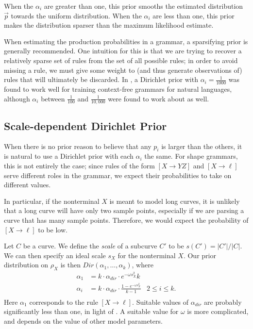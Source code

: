 When the $\alpha_i$ are greater than one, this prior smooths the
estimated distribution $\vec{p}$ towards the uniform
distribution. When the $\alpha_i$ are less than one, this prior makes
the distribution sparser than the maximum likelihood estimate. 

When estimating the production probabilities in a grammar, a
sparsifying prior is generally recommended. One intuition for this is
that we are trying to recover a relatively sparse set of rules from
the set of all possible rules; in order to avoid missing a rule, we
must give some weight to (and thus generate observations of) rules
that will ultimately be discarded. In \cite{johnson-naacl}, a
Dirichlet prior with $\alpha_i = \frac{1}{1000}$ was found to work
well for training context-free grammars for natural languages,
although $\alpha_i$ between $\frac{1}{100}$ and $\frac{1}{10,000}$
were found to work about as well.

\subsection{Scale-dependent Dirichlet Prior}
\label{sec-scale}

When there is no prior reason to believe that any $p_i$ is larger than
the others, it is natural to use a Dirichlet prior with each
$\alpha_i$ the same. For shape grammars, this is not entirely the
case; since rules of the form $[X\to YZ]$ and $[X\to \ell]$ serve
different roles in the grammar, we expect their probabilities to take
on different values. 

In particular, if the nonterminal $X$ is meant to model long curves,
it is unlikely that a long curve will have only two sample points,
especially if we are parsing a curve that has many sample
points. Therefore, we would expect the probability of $[X\to \ell]$ to
be low.

Let $C$ be a curve. We define the \emph{scale} of a subcurve $C'$ to
be $s(C') = |C'| / |C|$. We can then specify an ideal scale $s_X$ for
the nonterminal $X$. Our prior distribution on $\rho_X$ is then
$Dir(\alpha_1,\dots,\alpha_k)$, where
\begin{align*}
\alpha_1 &= k \cdot \alpha_{dir} \cdot e^{-\omega s_X^2}k &\\
\alpha_i &= k \cdot \alpha_{dir} \cdot \frac{1 - e^{-\omega s_X^2}}{k-1} & 2 \le i \le k.\\
\end{align*}
Here $\alpha_1$ corresponds to the rule $[X\to \ell]$. Suitable values
of $\alpha_{dir}$ are probably significantly less than one, in light
of \cite{johnson-naacl}. A suitable value for $\omega$ is more
complicated, and depends on the value of other model parameters.


